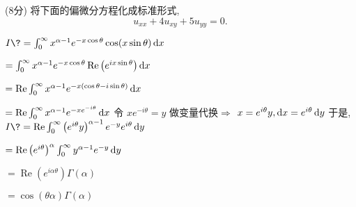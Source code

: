 \documentclass{njustexam}
\begin{document}
\bigskip


 

\begin{problem}{(8分)}
  将下面的偏微分方程化成标准形式,
   $$
   u_{x x}+4 u_{x y}+5 u_{y y}=0.
   $$

 \end{problem}
   \begin{solution}
 
  $ I\?=\int_0^{\infty} x^{\alpha-1} e^{-x \cos \theta} \cos (x \sin \theta) \dx$ \par
     \+ $=\int_0^{\infty} x^{\alpha-1} e^{-x \cos \theta} \operatorname{Re}\left(e^{i x \sin \theta}\right) \mathop{}\!\mathrm{d} x $ \par
     \+ $=\operatorname{Re} \int_0^{\infty} x^{\alpha-1} e^{-x(\cos \theta-i \sin \theta)} \mathop{}\!\mathrm{d} x$ \par
    \+ $=\operatorname{Re} \int_0^{\infty} x^{\alpha-1} e^{-x e^{-i \theta}} \mathop{}\!\mathrm{d} x$ 
   令 $x e^{-i \theta}=y$ 做变量代换$\Rightarrow$ $x=e^{i \theta} y, \mathop{}\!\mathrm{d} x=e^{i \theta} \mathop{}\!\mathrm{d} y$  \newline
   于是, $I \?=\operatorname{Re} \int_0^{\infty}\left(e^{i \theta} y\right)^{\alpha-1} e^{-y} e^{i \theta} \dy $ \par
         \+ $ =\operatorname{Re}\left(e^{i \theta}\right)^\alpha \int_0^{\infty} y^{\alpha-1} e^{-y} \mathop{}\!\mathrm{d} y $ \par
         \+ $ =\operatorname{Re}\left(e^{i \alpha \theta}\right) \Gamma(\alpha)$ \par
         \+ $ = \cos {(\theta \alpha)} \Gamma(\alpha)  $
\end{solution}
\end{document}

